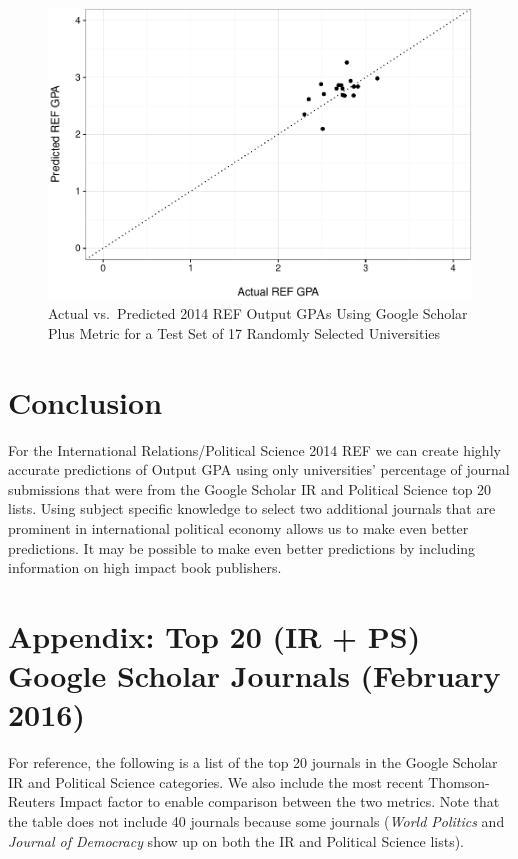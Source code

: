 \documentclass[]{article}
\begin{document}
\begin{figure}[htbp]
\centering
\includegraphics{README_files/figure-latex/unnamed-chunk-4-1.pdf}
\caption{Actual vs.~Predicted 2014 REF Output GPAs Using Google Scholar
Plus Metric for a Test Set of 17 Randomly Selected Universities}
\end{figure}

\section{Conclusion}\label{conclusion}

For the International Relations/Political Science 2014 REF we can create
highly accurate predictions of Output GPA using only universities'
percentage of journal submissions that were from the Google Scholar IR
and Political Science top 20 lists. Using subject specific knowledge to
select two additional journals that are prominent in international
political economy allows us to make even better predictions. It may be
possible to make even better predictions by including information on
high impact book publishers.

\section{Appendix: Top 20 (IR + PS) Google Scholar Journals (February
2016)}\label{appendix-top-20-ir-ps-google-scholar-journals-february-2016}

For reference, the following is a list of the top 20 journals in the
Google Scholar IR and Political Science categories. We also include the
most recent Thomson-Reuters Impact factor to enable comparison between
the two metrics. Note that the table does not include 40 journals
because some journals (\emph{World Politics} and \emph{Journal of
Democracy} show up on both the IR and Political Science lists).
\end{document}
